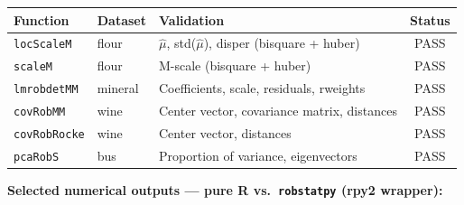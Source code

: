 \documentclass[11pt]{article}
\begin{document}
\renewcommand{\arraystretch}{1.2}
\begin{tabularx}{\linewidth}{@{} l l X c @{}}
  \toprule
  \textbf{Function} & \textbf{Dataset} & \textbf{Validation} & \textbf{Status} \\
  \midrule
  \texttt{locScaleM}   & flour   & $\hat\mu$, std($\hat\mu$), disper (bisquare + huber) & PASS \\
  \texttt{scaleM}      & flour   & M-scale (bisquare + huber) & PASS \\
  \texttt{lmrobdetMM}  & mineral & Coefficients, scale, residuals, rweights & PASS \\
  \texttt{covRobMM}    & wine    & Center vector, covariance matrix, distances & PASS \\
  \texttt{covRobRocke} & wine    & Center vector, distances & PASS \\
  \texttt{pcaRobS}     & bus     & Proportion of variance, eigenvectors & PASS \\
  \bottomrule
\end{tabularx}
\renewcommand{\arraystretch}{1}

\vspace{0.8em}
\noindent\textbf{Selected numerical outputs --- pure R vs.\ \texttt{robstatpy} (rpy2 wrapper):}
\end{document}
